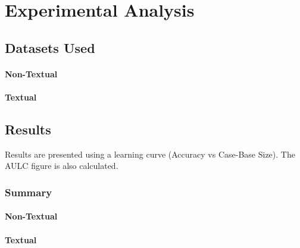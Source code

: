 \documentclass[a4paper,11pt]{report}
\begin{document}
\chapter{Experimental Analysis\label{cha:expanalysis}}
\section{Datasets Used}
\subsubsection{Non-Textual}

\subsubsection{Textual}

\section{Results}
Results are presented using a learning curve (Accuracy vs Case-Base Size). The AULC figure is also calculated.

\begin{table}
\subsection{Summary}

\subsubsection{Non-Textual}
{\footnotesize {}}

\subsubsection{Textual}
{\footnotesize {}}
\end{table}
\end{document}
